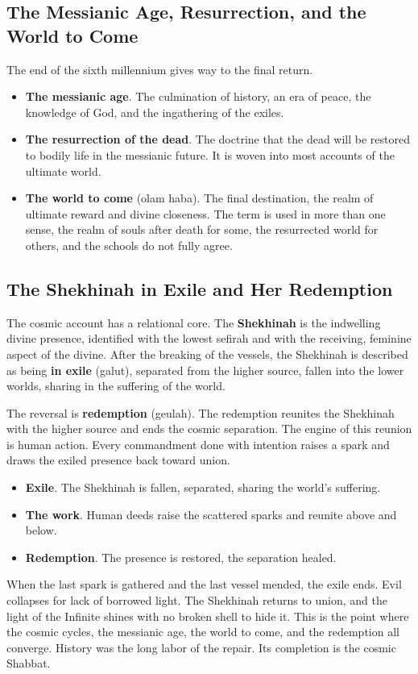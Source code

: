 \subsection{The Messianic Age, Resurrection, and the World to Come}

The end of the sixth millennium gives way to the final return.

\begin{itemize}
 \item \textbf{The messianic age}. The culmination of history, an era of peace,
 the knowledge of God, and the ingathering of the exiles.
 \item \textbf{The resurrection of the dead}. The doctrine that the dead will be
 restored to bodily life in the messianic future. It is woven into most
 accounts of the ultimate world.
 \item \textbf{The world to come} (olam haba). The final destination, the realm of
 ultimate reward and divine closeness. The term is used in more than one
 sense, the realm of souls after death for some, the resurrected world for
 others, and the schools do not fully agree.
\end{itemize}

\subsection{The Shekhinah in Exile and Her Redemption}

The cosmic account has a relational core. The \textbf{Shekhinah} is the indwelling
divine presence, identified with the lowest sefirah and with the receiving,
feminine aspect of the divine. After the breaking of the vessels, the Shekhinah is
described as being \textbf{in exile} (galut), separated from the higher source,
fallen into the lower worlds, sharing in the suffering of the world.

The reversal is \textbf{redemption} (geulah). The redemption reunites the Shekhinah
with the higher source and ends the cosmic separation. The engine of this reunion
is human action. Every commandment done with intention raises a spark and draws
the exiled presence back toward union.

\begin{itemize}
 \item \textbf{Exile}. The Shekhinah is fallen, separated, sharing the world's
 suffering.
 \item \textbf{The work}. Human deeds raise the scattered sparks and reunite
 above and below.
 \item \textbf{Redemption}. The presence is restored, the separation healed.
\end{itemize}

When the last spark is gathered and the last vessel mended, the exile ends. Evil
collapses for lack of borrowed light. The Shekhinah returns to union, and the
light of the Infinite shines with no broken shell to hide it. This is the point
where the cosmic cycles, the messianic age, the world to come, and the redemption
all converge. History was the long labor of the repair. Its completion is the
cosmic Shabbat.
